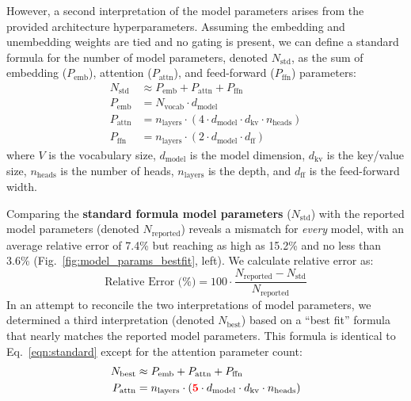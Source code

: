 However, a second interpretation of the model parameters arises from the provided architecture hyperparameters. 
Assuming the embedding and unembedding weights are tied \citep{press2017using} and no gating is present, we can define a standard formula for the number of model parameters, denoted $N_{\text{std}}$, as the sum of embedding ($P_{\text{emb}}$), attention ($P_{\text{attn}}$), and feed-forward ($P_{\text{ffn}}$) parameters:
\begin{align}\label{eqn:standard}
    N_{\text{std}} &\approx P_{\text{emb}} + P_{\text{attn}} + P_{\text{ffn}} \\
    P_{\text{emb}} &= N_{\text{vocab}} \cdot d_{\text{model}} \nonumber \\
    P_{\text{attn}} &= n_{\text{layers}} \cdot (4 \cdot d_{\text{model}} \cdot d_{\text{kv}} \cdot n_{\text{heads}}) \nonumber \\
    P_{\text{ffn}} &= n_{\text{layers}} \cdot (2 \cdot d_{\text{model}} \cdot d_{\text{ff}}) \nonumber
\end{align}
\noindent where $V$ is the vocabulary size, $d_{\text{model}}$ is the model dimension, $d_{\text{kv}}$ is the key/value size, $n_{\text{heads}}$ is the number of heads, $n_{\text{layers}}$ is the depth, and $d_{\text{ff}}$ is the feed-forward width.

Comparing the \textbf{standard formula model parameters} ($N_{\text{std}}$) with the reported model parameters (denoted $N_{\text{reported}}$) reveals a mismatch for \textit{every} model, with an average relative error of 7.4\% but reaching as high as 15.2\% and no less than 3.6\% (Fig.~\ref{fig:model_params_bestfit}, left).
We calculate relative error as:
%
\begin{equation}
    \text{Relative Error (\%)} = 100 \cdot \frac{N_{\text{reported}} - N_{\text{std}}}{N_{\text{reported}}}
\end{equation}
%
In an attempt to reconcile the two interpretations of model parameters, we determined a third interpretation (denoted $N_{\text{best}}$) based on a ``best fit'' formula that nearly matches the reported model parameters. 
This formula is identical to Eq.~\ref{eqn:standard} except for the attention parameter count:
%
\begin{align}\label{eqn:bestfit}
    N_{\text{best}} &\approx P_{\text{emb}} + P_{\text{attn}} + P_{\text{ffn}} \\
    P_{\text{attn}} &= n_{\text{layers}} \cdot (\textcolor{red}{\mathbf{5}} \cdot d_{\text{model}} \cdot d_{\text{kv}} \cdot n_{\text{heads}}) \nonumber
\end{align}


